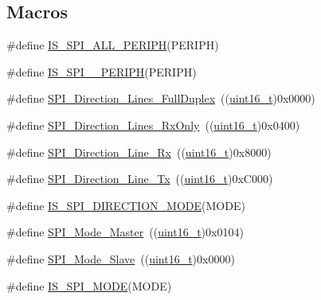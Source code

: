 \subsection*{Macros}
\begin{DoxyCompactItemize}
\item 
\#define \hyperlink{group___s_p_i___exported___constants_gaf54f84a30a5914b54dbfdc186720d0ba}{I\+S\+\_\+\+S\+P\+I\+\_\+\+A\+L\+L\+\_\+\+P\+E\+R\+I\+PH}(P\+E\+R\+I\+PH)
\item 
\#define \hyperlink{group___s_p_i___exported___constants_gae2222c673a036497587b8791f89428d0}{I\+S\+\_\+\+S\+P\+I\+\_\+\_\+\+P\+E\+R\+I\+PH}(P\+E\+R\+I\+PH)
\item 
\#define \hyperlink{group___s_p_i__data__direction_gab6bdb82e315a90210c4425c46bbdf5f1}{S\+P\+I\+\_\+\+Direction\+\_\+Lines\+\_\+\+Full\+Duplex}~((\hyperlink{_p_e___types_8h_a1f1825b69244eb3ad2c7165ddc99c956}{uint16\+\_\+t})0x0000)
\item 
\#define \hyperlink{group___s_p_i__data__direction_gab8ab942f7240394f50e4c86c5288516a}{S\+P\+I\+\_\+\+Direction\+\_\+Lines\+\_\+\+Rx\+Only}~((\hyperlink{_p_e___types_8h_a1f1825b69244eb3ad2c7165ddc99c956}{uint16\+\_\+t})0x0400)
\item 
\#define \hyperlink{group___s_p_i__data__direction_ga42ea8306cfc1f23ffc51efae6f66320e}{S\+P\+I\+\_\+\+Direction\+\_\+Line\+\_\+\+Rx}~((\hyperlink{_p_e___types_8h_a1f1825b69244eb3ad2c7165ddc99c956}{uint16\+\_\+t})0x8000)
\item 
\#define \hyperlink{group___s_p_i__data__direction_ga70cc710a771065b2ed11c2ac9697defe}{S\+P\+I\+\_\+\+Direction\+\_\+Line\+\_\+\+Tx}~((\hyperlink{_p_e___types_8h_a1f1825b69244eb3ad2c7165ddc99c956}{uint16\+\_\+t})0x\+C000)
\item 
\#define \hyperlink{group___s_p_i__data__direction_ga536857c68ce1d9806c04046707448b3e}{I\+S\+\_\+\+S\+P\+I\+\_\+\+D\+I\+R\+E\+C\+T\+I\+O\+N\+\_\+\+M\+O\+DE}(M\+O\+DE)
\item 
\#define \hyperlink{group___s_p_i__mode_gaa9e47fb7c1d6c4655b72a00ed1f3b651}{S\+P\+I\+\_\+\+Mode\+\_\+\+Master}~((\hyperlink{_p_e___types_8h_a1f1825b69244eb3ad2c7165ddc99c956}{uint16\+\_\+t})0x0104)
\item 
\#define \hyperlink{group___s_p_i__mode_ga84621141413ee07cb2d2dc82da2baa42}{S\+P\+I\+\_\+\+Mode\+\_\+\+Slave}~((\hyperlink{_p_e___types_8h_a1f1825b69244eb3ad2c7165ddc99c956}{uint16\+\_\+t})0x0000)
\item 
\#define \hyperlink{group___s_p_i__mode_gad5135300763c75dbb446861536359f12}{I\+S\+\_\+\+S\+P\+I\+\_\+\+M\+O\+DE}(M\+O\+DE)

\end{DoxyCompactItemize}
